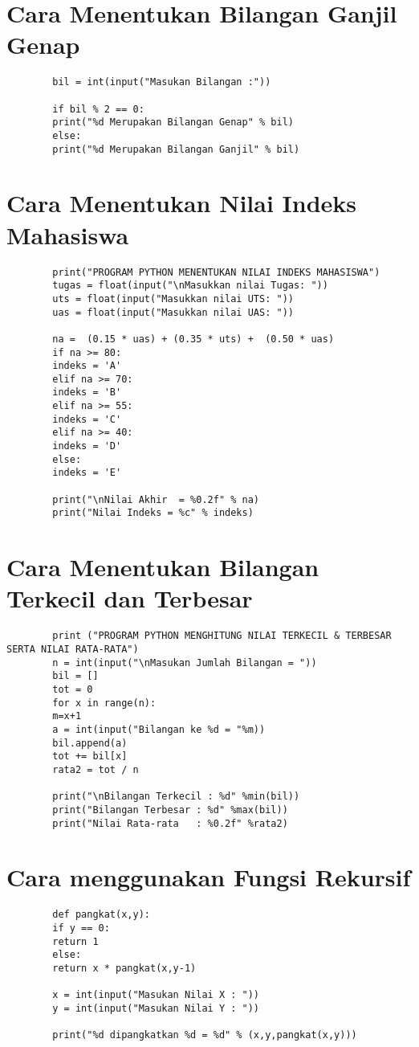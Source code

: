 \documentclass{article}
\begin{document}
	\section {Cara Menentukan Bilangan Ganjil Genap}
	\begin{lstlisting}
		bil = int(input("Masukan Bilangan :"))
		
		if bil % 2 == 0:
		print("%d Merupakan Bilangan Genap" % bil)
		else:
		print("%d Merupakan Bilangan Ganjil" % bil)
	\end{lstlisting}

	\section {Cara Menentukan Nilai Indeks Mahasiswa}
	\begin{lstlisting}
		print("PROGRAM PYTHON MENENTUKAN NILAI INDEKS MAHASISWA")
		tugas = float(input("\nMasukkan nilai Tugas: "))
		uts = float(input("Masukkan nilai UTS: "))
		uas = float(input("Masukkan nilai UAS: "))
		
		na =  (0.15 * uas) + (0.35 * uts) +  (0.50 * uas)
		if na >= 80:
		indeks = 'A'
		elif na >= 70:
		indeks = 'B'
		elif na >= 55:
		indeks = 'C'
		elif na >= 40:
		indeks = 'D'
		else:
		indeks = 'E'
		
		print("\nNilai Akhir  = %0.2f" % na)
		print("Nilai Indeks = %c" % indeks)
	\end{lstlisting}

	\section {Cara Menentukan Bilangan Terkecil dan Terbesar
	}
	\begin{lstlisting}
		print ("PROGRAM PYTHON MENGHITUNG NILAI TERKECIL & TERBESAR SERTA NILAI RATA-RATA")
		n = int(input("\nMasukan Jumlah Bilangan = "))
		bil = []
		tot = 0
		for x in range(n):
		m=x+1
		a = int(input("Bilangan ke %d = "%m))
		bil.append(a)
		tot += bil[x]
		rata2 = tot / n
		
		print("\nBilangan Terkecil : %d" %min(bil))
		print("Bilangan Terbesar : %d" %max(bil))
		print("Nilai Rata-rata   : %0.2f" %rata2)
	\end{lstlisting}

	\section {Cara menggunakan Fungsi Rekursif}
	\begin{lstlisting}
		def pangkat(x,y):
		if y == 0:
		return 1
		else:
		return x * pangkat(x,y-1)
		
		x = int(input("Masukan Nilai X : "))
		y = int(input("Masukan Nilai Y : "))
		
		print("%d dipangkatkan %d = %d" % (x,y,pangkat(x,y)))
	\end{lstlisting}
\end{document}
